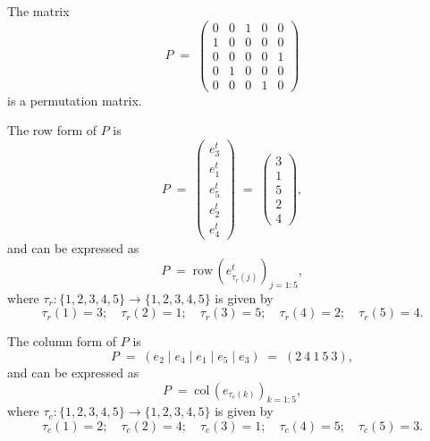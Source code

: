 \begin{examplex}
The matrix
\[
P \;=\; \begin{pmatrix}
0 & 0 & 1 & 0 & 0 \\
1 & 0 & 0 & 0 & 0 \\
0 & 0 & 0 & 0 & 1 \\
0 & 1 & 0 & 0 & 0 \\
0 & 0 & 0 & 1 & 0
\end{pmatrix}
\]
is a permutation matrix.

The row form of $P$ is
\[
P \;=\; \begin{pmatrix} e_3^t \\ e_1^t \\ e_5^t \\ e_2^t \\ e_4^t \end{pmatrix}
\;=\; \begin{pmatrix} 3 \\ 1 \\ 5 \\ 2 \\ 4 \end{pmatrix},
\]
and can be expressed as
\[
P \;=\; \mathrm{row}\,\!\left(e_{\tau_r(j)}^t\right)_{j=1:5},
\]
where $\tau_r : \{1,2,3,4,5\} \to \{1,2,3,4,5\}$ is given by
\[
\tau_r(1) = 3; \quad \tau_r(2) = 1; \quad \tau_r(3) = 5; \quad \tau_r(4) = 2; \quad
\tau_r(5) = 4.
\]

The column form of $P$ is
\[
P \;=\; (e_2 \mid e_4 \mid e_1 \mid e_5 \mid e_3) \;=\; (2\ 4\ 1\ 5\ 3),
\]
and can be expressed as
\[
P \;=\; \mathrm{col}\,\!\left(e_{\tau_c(k)}\right)_{k=1:5},
\]
where $\tau_c : \{1,2,3,4,5\} \to \{1,2,3,4,5\}$ is given by
\[
\tau_c(1) = 2; \quad \tau_c(2) = 4; \quad \tau_c(3) = 1; \quad \tau_c(4) = 5; \quad
\tau_c(5) = 3.
\]
\end{examplex}

